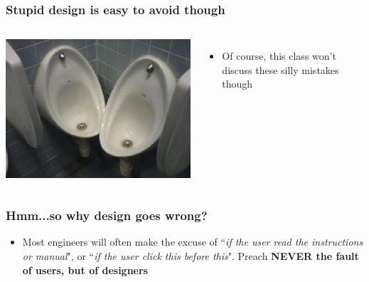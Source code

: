 \documentclass{beamer}
\begin{document}
\begin{frame}
\frametitle{Stupid design is easy to avoid though}
\begin{columns}[c] %
	
	\centering
	\includegraphics[width=1\linewidth]{toiletb}\newline
	
	\begin{itemize}
		\item Of course, this class won't discuss these silly mistakes though %
	\end{itemize}
\end{columns}
\end{frame}


\begin{frame}
\frametitle{Hmm...so why design goes wrong?}
\begin{itemize}
	\item Most engineers will often make the excuse of ``\textit{if the user read the instructions or manual}", or ``\textit{if the user click this before this}".  Preach \textbf{NEVER the fault of users, but of designers}
\end{itemize}
\end{frame}
\end{document}
